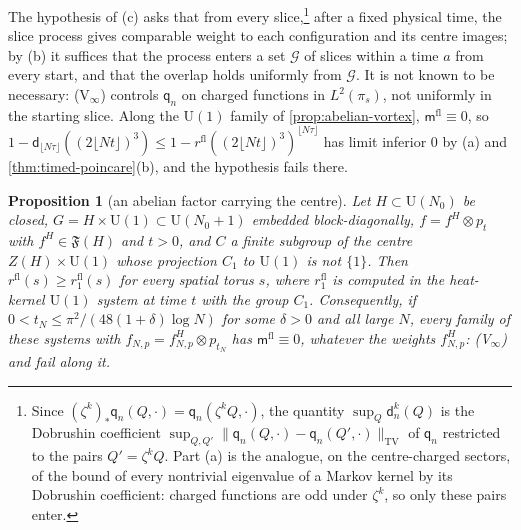 \documentclass[11pt,a4paper]{amsart}
\newtheorem{proposition}[theorem]{Proposition}
\theoremstyle{definition}
\theoremstyle{remark}
\numberwithin{equation}{section}
\newcommand{\Fclass}{\mathfrak{F}}   %
\newcommand{\norm}[1]{\lVert #1\rVert}     %
\newcommand{\U}{\mathrm{U}}                %
\newcommand{\cube}[1]{(2#1)^3}             %
\newcommand{\Mcirc}{\text{\upshape(M$^{\circ}$)}}   %
\begin{document}
The hypothesis of (c) asks that from every slice,\footnote{Since $(\zeta^k)_*\mathsf q_n(Q,\cdot)=\mathsf q_n(\zeta^kQ,\cdot)$, the quantity $\sup_Q\mathsf d^k_n(Q)$ is the Dobrushin coefficient $\sup_{Q,Q'}\norm{\mathsf q_n(Q,\cdot)-\mathsf q_n(Q',\cdot)}_{\mathrm{TV}}$ of $\mathsf q_n$ restricted to the pairs $Q'=\zeta^kQ$. Part (a) is the analogue, on the centre-charged sectors, of the bound of every nontrivial eigenvalue of a Markov kernel by its Dobrushin coefficient: charged functions are odd under $\zeta^k$, so only these pairs enter.} after a fixed physical time, the slice process gives comparable weight to each configuration and its centre images; by (b) it suffices that the process enters a set $\mathcal G$ of slices within a time $a$ from every start, and that the overlap holds uniformly from $\mathcal G$. It is not known to be necessary: \textup{(V$_\infty$)} controls $\mathsf q_n$ on charged functions in $L^2(\pi_s)$, not uniformly in the starting slice. Along the $\U(1)$ family of \cref{prop:abelian-vortex}, $\mathsf m^{\mathrm{fl}}\equiv0$, so $1-\mathsf d_{\lfloor N\tau\rfloor}(\cube{\lfloor Nt\rfloor})\le1-r^{\mathrm{fl}}(\cube{\lfloor Nt\rfloor})^{\lfloor N\tau\rfloor}$ has limit inferior $0$ by (a) and \cref{thm:timed-poincare}(b), and the hypothesis fails there.

\begin{proposition}[an abelian factor carrying the centre]\label{prop:abelian-factor}
Let $H\subset\U(N_0)$ be closed, $G=H\times\U(1)\subset\U(N_0+1)$ embedded block-diagonally, $f=f^H\otimes p_t$ with $f^H\in\Fclass(H)$ and $t>0$, and $C$ a finite subgroup of the centre $Z(H)\times\U(1)$ whose projection $C_1$ to $\U(1)$ is not $\{1\}$. Then $r^{\mathrm{fl}}(s)\ge r^{\mathrm{fl}}_1(s)$ for every spatial torus $s$, where $r^{\mathrm{fl}}_1$ is computed in the heat-kernel $\U(1)$ system at time $t$ with the group $C_1$. Consequently, if $0<t_N\le\pi^2/(48(1+\delta)\log N)$ for some $\delta>0$ and all large $N$, every family of these systems with $f_{N,p}=f^H_{N,p}\otimes p_{t_N}$ has $\mathsf m^{\mathrm{fl}}\equiv0$, whatever the weights $f^H_{N,p}$: \textup{(V$_\infty$)} and \Mcirc{} fail along it.
\end{proposition}
\end{document}
